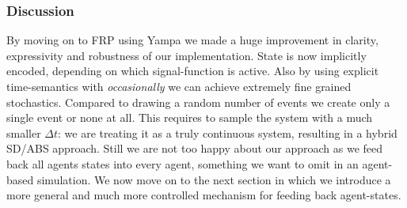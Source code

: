 \subsubsection{Discussion}
By moving on to FRP using Yampa we made a huge improvement in clarity, expressivity and robustness of our implementation. State is now implicitly encoded, depending on which signal-function is active. Also by using explicit time-semantics with \textit{occasionally} we can achieve extremely fine grained stochastics. Compared to drawing a random number of events we create only a single event or none at all. This requires to sample the system with a much smaller $\Delta t$: we are treating it as a truly continuous system, resulting in a hybrid SD/ABS approach.
Still we are not too happy about our approach as we feed back all agents states into every agent, something we want to omit in an agent-based simulation. We now move on to the next section in which we introduce a more general and much more controlled mechanism for feeding back agent-states. 